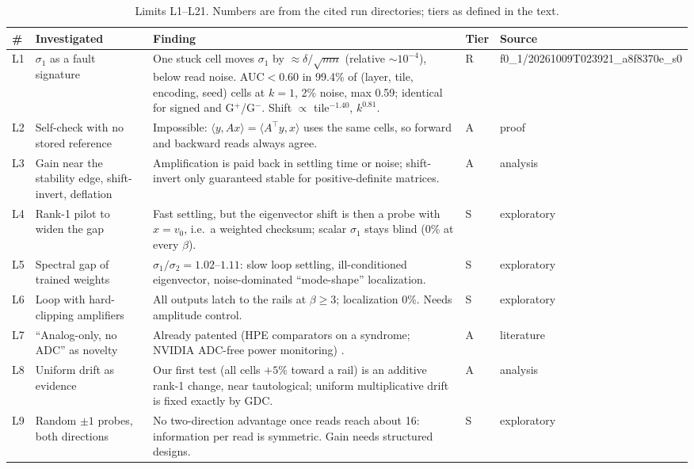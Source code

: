 \documentclass[journal]{IEEEtran}
\begin{document}
\begin{table}[t]
\caption{Limits L1--L21. Numbers are from the cited run directories; tiers as defined in the text.}
\label{tab:limits}
\centering\scriptsize
\begin{tabular}{p{0.5cm}p{3.9cm}p{8.8cm}p{0.5cm}p{2.5cm}}
\toprule
\# & Investigated & Finding & Tier & Source \\
\midrule
L1 & $\sigma_1$ as a fault signature & One stuck cell moves $\sigma_1$ by $\approx\delta/\sqrt{mn}$ (relative $\sim10^{-4}$), below read noise. AUC$<0.60$ in 99.4\% of (layer, tile, encoding, seed) cells at $k{=}1$, 2\% noise, max 0.59; identical for signed and G$^+$/G$^-$. Shift $\propto$ tile$^{-1.40}$, $k^{0.81}$. & R & f0\_1/\allowbreak 20261009T023921\_a8f8370e\_s0 \\
L2 & Self-check with no stored reference & Impossible: $\langle y,Ax\rangle=\langle A^{\!\top}y,x\rangle$ uses the same cells, so forward and backward reads always agree. & A & proof \\
L3 & Gain near the stability edge, shift-invert, deflation & Amplification is paid back in settling time or noise; shift-invert only guaranteed stable for positive-definite matrices. & A & analysis \\
L4 & Rank-1 pilot to widen the gap & Fast settling, but the eigenvector shift is then a probe with $x=v_0$, i.e.\ a weighted checksum; scalar $\sigma_1$ stays blind (0\% at every $\beta$). & S & exploratory \\
L5 & Spectral gap of trained weights & $\sigma_1/\sigma_2=1.02$--$1.11$: slow loop settling, ill-conditioned eigenvector, noise-dominated ``mode-shape'' localization. & S & exploratory \\
L6 & Loop with hard-clipping amplifiers & All outputs latch to the rails at $\beta\ge3$; localization 0\%. Needs amplitude control. & S & exploratory \\
L7 & ``Analog-only, no ADC'' as novelty & Already patented (HPE comparators on a syndrome; NVIDIA ADC-free power monitoring) \cite{hpe11804859,hpe11532356,nvidia11971790}. & A & literature \\
L8 & Uniform drift as evidence & Our first test (all cells $+5\%$ toward a rail) is an additive rank-1 change, near tautological; uniform multiplicative drift is fixed exactly by GDC. & A & analysis \\
L9 & Random $\pm1$ probes, both directions & No two-direction advantage once reads reach about 16: information per read is symmetric. Gain needs structured designs. & S & exploratory \\

\end{tabular}
\end{table}
\end{document}
